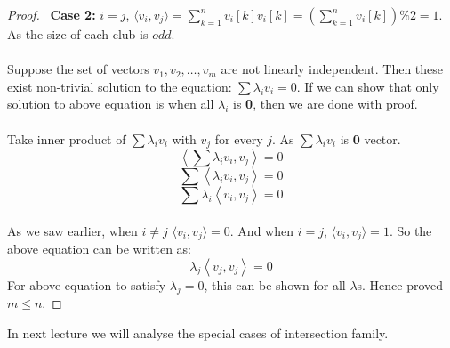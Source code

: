 \begin{theorem}
\begin{proof}
~\textbf{Case 2:} $i= j$, $\langle v_i,v_j\rangle = \sum_{k=1}^{n} v_i[k]v_i[k] = (\sum_{k=1}^{n} v_i[k])\%2= 1$. As the size of each club is $odd$.\\\\
Suppose the set of vectors $v_1, v_2, \hdots, v_m$ are not linearly independent. Then these exist non-trivial solution to the equation: $\sum \lambda_i v_i=0$. If we can show that only solution to above equation is when all $\lambda_i$ is \textbf{0}, then we are done with proof.\\\\
Take inner product of $\sum \lambda_i v_i$ with $v_j$ for every $j$. As $\sum \lambda_i v_i$ is \textbf{0} vector.
$$ \left \langle \sum \lambda_i v_i,v_j\right\rangle = 0$$
$$  \sum \left \langle \lambda_i v_i,v_j\right\rangle = 0$$
$$  \sum \lambda_i \left \langle  v_i,v_j\right\rangle = 0$$\\
As we saw earlier, when $i\neq j$ $\langle v_i,v_j\rangle=0$. And when $i= j$, $\langle v_i,v_j\rangle=1$. So the above equation can be written as:
$$  \lambda_j \left \langle  v_j,v_j\right\rangle = 0$$
For above equation to satisfy $\lambda_j=0$, this can be shown for all $\lambda$s. Hence proved $m\le n$.
\end{proof}
\end{theorem}
In next lecture we will analyse the special cases of intersection family.


